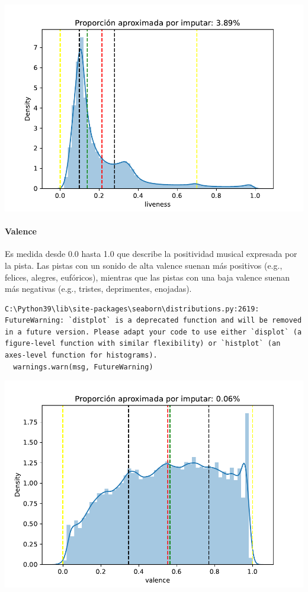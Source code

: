 \documentclass[
  letterpaper,
  DIV=11,
  numbers=noendperiod]{scrartcl}
\let\oldparagraph\paragraph
\renewcommand{\paragraph}[1]{\oldparagraph{#1}\mbox{}}
\begin{document}
\includegraphics{informe_01_files/figure-pdf/unnamed-chunk-14-5.pdf}

\hypertarget{valence}{%
\paragraph{Valence}\label{valence}}

Es medida desde 0.0 hasta 1.0 que describe la positividad musical
expresada por la pista. Las pistas con un sonido de alta valence suenan
más positivos (e.g., felices, alegres, eufóricos), mientras que las
pistas con una baja valence suenan más negativas (e.g., tristes,
deprimentes, enojadas).

\begin{verbatim}
C:\Python39\lib\site-packages\seaborn\distributions.py:2619: FutureWarning: `distplot` is a deprecated function and will be removed in a future version. Please adapt your code to use either `displot` (a figure-level function with similar flexibility) or `histplot` (an axes-level function for histograms).
  warnings.warn(msg, FutureWarning)
\end{verbatim}

\includegraphics{informe_01_files/figure-pdf/unnamed-chunk-16-7.pdf}
\end{document}
